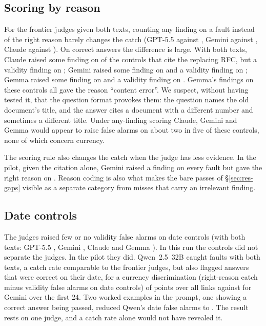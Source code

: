 \subsection{Scoring by reason}
\label{sec:res-scoring}

For the frontier judges given both texts, counting any finding on a fault instead of the right reason barely changes
the catch (GPT-5.5 \EGPTCatchTexts{} against \EGPTCatchAnyTexts, Gemini \EGeminiCatchTexts{} against \EGeminiCatchAnyTexts,
Claude \EOpusCatchTexts{} against \EOpusCatchAnyTexts). On correct answers the difference is large. With both texts, Claude raised some finding on
\EOpusCtrlAnyTexts{} of the controls that cite the replacing RFC, but a validity finding on \EOpusCtrlFATexts; Gemini
raised some finding on \EGeminiCtrlAnyTexts{} and a validity finding on \EGeminiCtrlFATexts; Gemma raised some finding on \EGemmaCtrlAnyTexts{} and a validity finding on \EGemmaCtrlFATexts. Gemma's findings on these
controls all gave the reason ``content error''. We suspect, without having tested it, that the question format provokes
them: the question names the old document's title, and the answer cites a document with a different number and
sometimes a different title. Under any-finding scoring Claude, Gemini and Gemma would appear to raise false alarms on about two in
five of these controls, none of which concern currency.

The scoring rule also changes the catch when the judge has less evidence. In the pilot, given the citation alone, Gemini raised a finding on
every fault but gave the right reason on \RfcCatchCiteOnlyGeminiThreeOnePro. Reason coding is also what makes the bare
passes of \S\ref{sec:res-gaps} visible as a separate category from misses that carry an irrelevant finding.

\subsection{Date controls}
\label{sec:res-dates}

The judges raised few or no validity false alarms on date controls (with both texts: GPT-5.5 \EGPTDateFATexts,
Gemini \EGeminiDateFATexts, Claude \EOpusDateFATexts{} and Gemma \EGemmaDateFATexts). In this run the controls
did not separate the judges. In the pilot they did. Qwen~2.5~32B caught \RfcCatchBothTextsQwenThreeTwoB{} faults with
both texts, a catch rate comparable to the frontier judges, but also flagged \RfcDateFABothTextsQwenThreeTwoB{} answers
that were correct on their date, for a currency discrimination (right-reason catch minus validity false alarms on date controls) of
\RfcDiscDateBothTextsQwenThreeTwoB{} points over all \RfcSample{} links against \RfcDiscDateBothTextsGeminiThreeOnePro{} for Gemini over the first 24.
Two worked examples in the prompt, one showing a correct answer being passed, reduced Qwen's date false alarms to \RfcDateFAFewShotQwenThreeTwoB. The result rests on one judge, and a catch rate alone would not
have revealed it.
